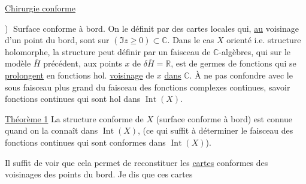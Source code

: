 \uline{}

\uline{Chirurgie conforme}

\textcircled{)} Surface conforme à bord. On  le définit par des
cartes locales qui, \uline{au} voisinage d'un point du
bord, sont  sur  $(\Im z\geq0)\subset\mathbb C$.
Dans le cas $X$ orienté i.e. structure holomorphe, la
structure peut  définir par un faisceau
de $\mathbb C$-algèbres, qui sur le modèle
$\overline H$ précédent, aux points $x$ de $\delta\overline H=\mathbb R$, est 
de germes de fonctions qui se \uline{prolongent} en
fonctions hol.  \uline{voisinage} de $x$ \uline{dans} $\mathbb C$.
À ne pas confondre avec le sous faisceau
plus grand du faisceau des fonctions
complexes continues, savoir  fonctions
continues qui sont hol dans $\operatorname{Int}(X)$.

\uline{Théorème 1} La structure conforme de $X$ (surface
conforme à bord) est connue quand on
la connaît dans $\operatorname{Int}(X)$, (ce qui suffit à
déterminer le faisceau des fonctions  continues
qui sont conformes dans $\operatorname{Int}(X)$).

Il suffit de voir que cela permet de
reconstituer les \uline{cartes} conformes des voisinages
des points du bord. Je dis que ces cartes

